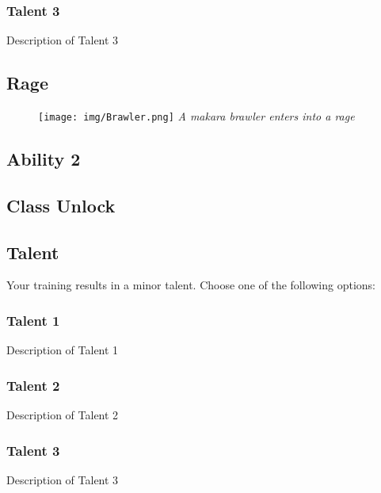 \subsubsection{Talent 3}
Description of Talent 3

\vspace{.1 in}

\subsection*{Rage}
\lipsum[1]

\vspace{.1 in}

\begin{figure}[ht!]
	\texttt{[image: img/Brawler.png]}
	\centering
	\textit{A makara brawler enters into a rage}
\end{figure}

\subsection*{Ability 2}
\lipsum[1]

\vspace{.1 in}

\subsection*{Class Unlock}
\lipsum[1]

\vspace{.1 in}

\subsection*{Talent}
Your training results in a minor talent. Choose one of the following options:

\subsubsection{Talent 1}
Description of Talent 1

\subsubsection{Talent 2}
Description of Talent 2

\subsubsection{Talent 3}
Description of Talent 3

